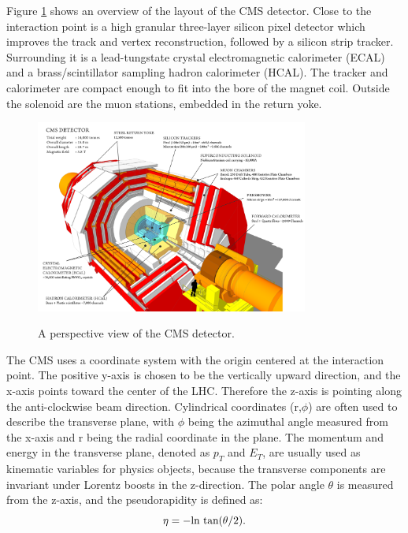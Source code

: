\documentclass[thesis.tex]{subfiles}
\begin{document}
Figure \ref{fig:cmslayout} shows an overview of the layout of the CMS detector. Close to the interaction point is a high granular three-layer silicon pixel detector which improves the track and vertex reconstruction, followed by a silicon strip tracker. Surrounding it is a lead-tungstate crystal electromagnetic calorimeter (ECAL) and a brass/scintillator sampling hadron calorimeter (HCAL). The tracker and calorimeter are compact enough to fit into the bore of the magnet coil. Outside the solenoid are the muon stations, embedded in the return yoke. 

\begin{figure}[hbtp]
	\centering
	\includegraphics[width=0.8\textwidth]{plot/cms_layout.png}
	\label{fig:cmslayout}
	\caption{A perspective view of the CMS detector.}
\end{figure}

The CMS uses a coordinate system with the origin centered at the interaction point. The positive y-axis is chosen to be the vertically upward direction, and the x-axis points toward the center of the LHC. Therefore the z-axis is pointing along the anti-clockwise beam direction. Cylindrical coordinates (r,$\phi$) are often used to describe the transverse plane, with $\phi$ being the azimuthal angle measured from the x-axis and r being the radial coordinate in the plane. The momentum and energy in the transverse plane, denoted as $p_T$ and $E_T$, are usually used as kinematic variables for physics objects, because the transverse components are invariant under Lorentz boosts in the z-direction. The polar angle $\theta$ is measured from the z-axis, and the pseudorapidity is defined as: 
\begin{equation}
	\centering
       \eta = -\text{ln tan}(\theta/2).
\end{equation}
\end{document}
